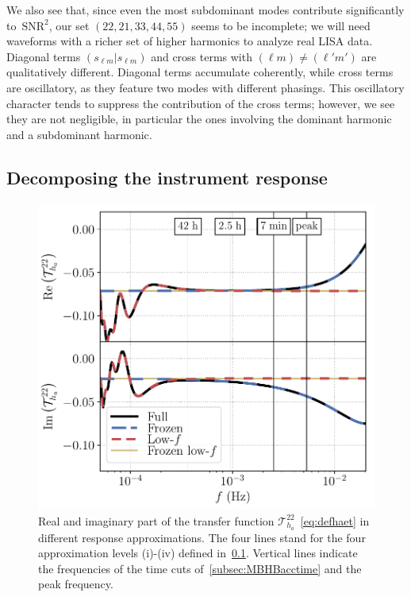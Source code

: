 \documentclass[aps,showpacs,twocolumn,prd,superscriptaddress,nofootinbib]{revtex4-1}
\newcommand\calT{{\mathcal{T}}}
\newcommand{\SNR}{\,\mathrm{SNR}}
\begin{document}
We also see that, since even the most subdominant modes contribute significantly to $\SNR^{2}$, our set $(22, 21, 33, 44, 55)$ seems to be incomplete; we will need waveforms with a richer set of higher harmonics to analyze real LISA data. Diagonal terms $(s_{\ell m} | s_{\ell m})$ and cross terms with $(\ell m) \neq (\ell' m')$ are qualitatively different. Diagonal terms accumulate coherently, while cross terms are oscillatory, as they feature two modes with different phasings. This oscillatory character tends to suppress the contribution of the cross terms; however, we see they are not negligible, in particular the ones involving the dominant harmonic and a subdominant harmonic.


\subsection{Decomposing the instrument response}
\label{subsec:MBHBresponseapprox}

\begin{figure}
  \centering
  \includegraphics[width=.98\linewidth]{responseapprox_tdia_22.pdf}
  \caption{Real and imaginary part of the transfer function $\calT^{22}_{h_{a}}$~\eqref{eq:defhaet} in different response approximations. The four lines stand for the four approximation levels (i)-(iv) defined in~\ref{subsec:MBHBresponseapprox}. Vertical lines indicate the frequencies of the time cuts of~\ref{subsec:MBHBacctime} and the peak frequency.}
  \label{fig:responseapproxtdia22}
\end{figure}
\end{document}
